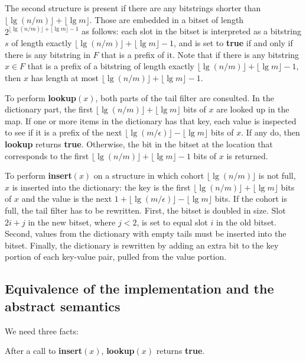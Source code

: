 \documentclass[11pt,letterpaper]{article}
\begin{document}
The second structure is present if there are any bitstrings shorter than $\lfloor \lg (n/m) \rfloor + \lfloor \lg m \rfloor$.
Those are embedded in a bitset of length $2^{\lfloor \lg (n/m) \rfloor + \lfloor \lg m \rfloor - 1}$ as follows:
each slot in the bitset is interpreted as a bitstring $s$ of length exactly $\lfloor \lg (n/m) \rfloor + \lfloor \lg m \rfloor - 1$, and is set to {\bf true} if and only if there is any bitstring in $F$ that is a prefix of it.
Note that if there is any bitstring $x \in F$ that is a prefix of a bitstring of length exactly $\lfloor \lg (n/m) \rfloor + \lfloor \lg m \rfloor - 1$, then $x$ has length at most $\lfloor \lg (n/m) \rfloor + \lfloor \lg m \rfloor - 1$.

To perform {\bf lookup$(x)$}, both parts of the tail filter are consulted.
In the dictionary part, the first $\lfloor \lg (n/m) \rfloor + \lfloor \lg m \rfloor$ bits of $x$ are looked up in the map.
If one or more items in the dictionary has that key, each value is inspected to see if it is a prefix of the next $\lfloor \lg(m/\epsilon) \rfloor - \lfloor \lg m \rfloor$ bits of $x$.
If any do, then {\bf lookup} returns {\bf true}.
Otherwise, the bit in the bitset at the location that corresponds to the first $\lfloor \lg (n/m) \rfloor + \lfloor \lg m \rfloor - 1$ bits of $x$ is returned.

To perform {\bf insert$(x)$} on a structure in which cohort $\lfloor \lg (n/m) \rfloor$ is not full, $x$ is inserted into the dictionary: the key is the first $\lfloor \lg (n/m) \rfloor + \lfloor \lg m \rfloor$ bits of $x$ and the value is the next $1 + \lfloor \lg (m/\epsilon) \rfloor - \lfloor \lg m \rfloor$ bits.
If the cohort is full, the tail filter has to be rewritten.
First, the bitset is doubled in size.
Slot $2i + j$ in the new bitset, where $j < 2$, is set to equal slot $i$ in the old bitset.
Second, values from the dictionary with empty tails must be inserted into the bitset.
Finally, the dictionary is rewritten by adding an extra bit to the key portion of each key-value pair, pulled from the value portion.

\subsection{Equivalence of the implementation and the abstract semantics}

We need three facts:

After a call to {\bf insert$(x)$}, {\bf lookup$(x)$} returns {\bf true}.
\end{document}
